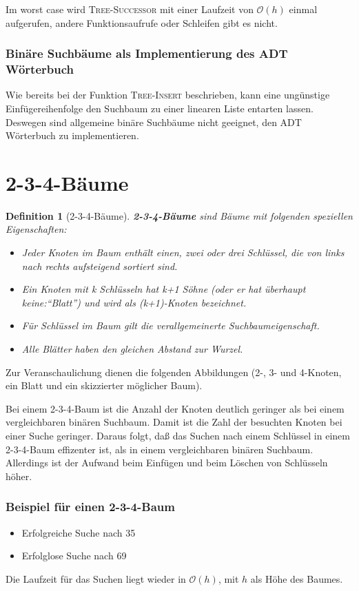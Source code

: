 \documentclass[ngerman,draft,parskip=half*,twoside]{scrreprt}
\theoremstyle{break}
\newtheorem{definition}{Definition}[chapter]
\theoremstyle{nonumberbreak}
\newcommand*{\OO}{\mathcal{O}}      %
\begin{document}
		Im worst case wird \textsc{Tree-Successor} mit einer Laufzeit von $\OO(h)$ einmal aufgerufen, 
		andere Funktionsaufrufe oder Schleifen gibt es nicht.
\subsubsection{Binäre Suchbäume als Implementierung des ADT Wörterbuch}
 		
	  	Wie bereits bei der Funktion \textsc{Tree-Insert} beschrieben, kann eine ungünstige 
	  	Einfügereihenfolge den Suchbaum zu einer linearen Liste entarten lassen. Deswegen sind allgemeine 
	  	binäre Suchbäume nicht geeignet, den ADT Wörterbuch zu implementieren.  	
\section{2-3-4-Bäume}
\begin{definition}[2-3-4-Bäume]
\textbf{2-3-4-Bäume} sind Bäume mit folgenden speziellen Eigenschaften:
\begin{itemize}
				\item Jeder Knoten im Baum enthält einen, zwei oder drei Schlüssel, 
							die von links nach rechts aufsteigend sortiert sind.		
				\item Ein Knoten mit k Schlüsseln hat k+1 Söhne (oder er hat überhaupt keine:``Blatt'') und wird als
							 (k+1)-Knoten bezeichnet.
				\item Für Schlüssel im Baum gilt die verallgemeinerte Suchbaumeigenschaft.
				\item Alle Blätter haben den gleichen Abstand zur Wurzel.	
			\end{itemize}
\end{definition}
Zur Veranschaulichung dienen die folgenden Abbildungen (2-, 3- und 4-Knoten, ein Blatt und ein skizzierter möglicher Baum).
			 			
				
	 			
		Bei einem 2-3-4-Baum ist die Anzahl der Knoten deutlich geringer als bei
		einem vergleichbaren binären Suchbaum. Damit ist die Zahl der besuchten 
		Knoten bei einer Suche geringer. Daraus folgt, daß das Suchen nach einem
		Schlüssel in einem 2-3-4-Baum effizenter ist, als in einem vergleichbaren binären Suchbaum.
		Allerdings ist der Aufwand beim Einfügen und beim Löschen von Schlüsseln höher.
\subsubsection{Beispiel für einen 2-3-4-Baum}
		
		\begin{itemize}
			\item Erfolgreiche Suche nach 35
			\item Erfolglose Suche nach 69
		\end{itemize}
		Die Laufzeit für das Suchen liegt wieder in $\OO(h)$, mit $h$ als Höhe des Baumes.
\end{document}
